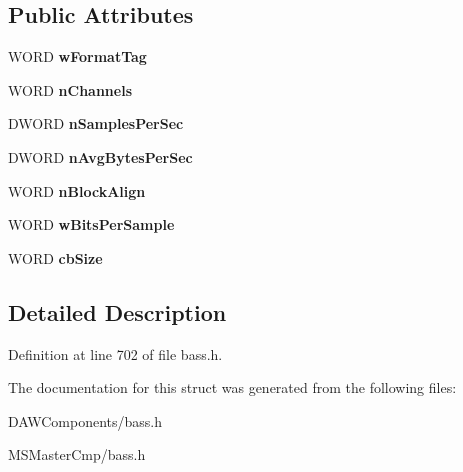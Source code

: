 \subsection*{Public Attributes}
\begin{DoxyCompactItemize}
\item 
\hypertarget{structt_w_a_v_e_f_o_r_m_a_t_e_x_aec624a88d0d94d7789c60dcc1418d6fc_aec624a88d0d94d7789c60dcc1418d6fc}{W\-O\-R\-D {\bfseries w\-Format\-Tag}}\label{structt_w_a_v_e_f_o_r_m_a_t_e_x_aec624a88d0d94d7789c60dcc1418d6fc_aec624a88d0d94d7789c60dcc1418d6fc}

\item 
\hypertarget{structt_w_a_v_e_f_o_r_m_a_t_e_x_ae71090e815279542a4f2ffea72ff1a07_ae71090e815279542a4f2ffea72ff1a07}{W\-O\-R\-D {\bfseries n\-Channels}}\label{structt_w_a_v_e_f_o_r_m_a_t_e_x_ae71090e815279542a4f2ffea72ff1a07_ae71090e815279542a4f2ffea72ff1a07}

\item 
\hypertarget{structt_w_a_v_e_f_o_r_m_a_t_e_x_ad3a2f0a0aed0d8b3a5f6afad5f8b6acc_ad3a2f0a0aed0d8b3a5f6afad5f8b6acc}{D\-W\-O\-R\-D {\bfseries n\-Samples\-Per\-Sec}}\label{structt_w_a_v_e_f_o_r_m_a_t_e_x_ad3a2f0a0aed0d8b3a5f6afad5f8b6acc_ad3a2f0a0aed0d8b3a5f6afad5f8b6acc}

\item 
\hypertarget{structt_w_a_v_e_f_o_r_m_a_t_e_x_a933a772d450a8a8939fc96d1eb15c672_a933a772d450a8a8939fc96d1eb15c672}{D\-W\-O\-R\-D {\bfseries n\-Avg\-Bytes\-Per\-Sec}}\label{structt_w_a_v_e_f_o_r_m_a_t_e_x_a933a772d450a8a8939fc96d1eb15c672_a933a772d450a8a8939fc96d1eb15c672}

\item 
\hypertarget{structt_w_a_v_e_f_o_r_m_a_t_e_x_abb977590324e3d1b5a14f94b806b8ec1_abb977590324e3d1b5a14f94b806b8ec1}{W\-O\-R\-D {\bfseries n\-Block\-Align}}\label{structt_w_a_v_e_f_o_r_m_a_t_e_x_abb977590324e3d1b5a14f94b806b8ec1_abb977590324e3d1b5a14f94b806b8ec1}

\item 
\hypertarget{structt_w_a_v_e_f_o_r_m_a_t_e_x_a888d33f1b1415c903bfa95ebedc78516_a888d33f1b1415c903bfa95ebedc78516}{W\-O\-R\-D {\bfseries w\-Bits\-Per\-Sample}}\label{structt_w_a_v_e_f_o_r_m_a_t_e_x_a888d33f1b1415c903bfa95ebedc78516_a888d33f1b1415c903bfa95ebedc78516}

\item 
\hypertarget{structt_w_a_v_e_f_o_r_m_a_t_e_x_a179487978b7d541067d6200524ceff2c_a179487978b7d541067d6200524ceff2c}{W\-O\-R\-D {\bfseries cb\-Size}}\label{structt_w_a_v_e_f_o_r_m_a_t_e_x_a179487978b7d541067d6200524ceff2c_a179487978b7d541067d6200524ceff2c}

\end{DoxyCompactItemize}


\subsection{Detailed Description}


Definition at line 702 of file bass.\-h.



The documentation for this struct was generated from the following files\-:\begin{DoxyCompactItemize}
\item 
D\-A\-W\-Components/bass.\-h\item 
M\-S\-Master\-Cmp/bass.\-h\end{DoxyCompactItemize}
